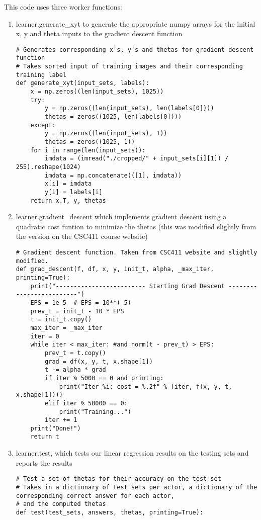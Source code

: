 \documentclass[11pt,a4paper]{report}
\begin{document}
This code uses three worker functions: 
\begin{enumerate}
\item learner.generate\_xyt to generate the appropriate numpy arrays for the initial x, y and theta inputs to the gradient descent function
\begin{lstlisting}
# Generates corresponding x's, y's and thetas for gradient descent function
# Takes sorted input of training images and their corresponding training label
def generate_xyt(input_sets, labels):
    x = np.zeros((len(input_sets), 1025))
    try:
        y = np.zeros((len(input_sets), len(labels[0])))
        thetas = zeros((1025, len(labels[0])))
    except:
        y = np.zeros((len(input_sets), 1))
        thetas = zeros((1025, 1))
    for i in range(len(input_sets)):
        imdata = (imread("./cropped/" + input_sets[i][1]) / 255).reshape(1024)
        imdata = np.concatenate(([1], imdata))
        x[i] = imdata
        y[i] = labels[i]
    return x.T, y, thetas
\end{lstlisting}
\item learner.gradient\_descent which implements gradient descent using a quadratic cost funtion to minimize the thetas (this was modified slightly from the version on the CSC411 course website)
\begin{lstlisting}
# Gradient descent function. Taken from CSC411 website and slightly modified.
def grad_descent(f, df, x, y, init_t, alpha, _max_iter, printing=True):
    print("------------------------- Starting Grad Descent -------------------------")
    EPS = 1e-5  # EPS = 10**(-5)
    prev_t = init_t - 10 * EPS
    t = init_t.copy()
    max_iter = _max_iter
    iter = 0
    while iter < max_iter: #and norm(t - prev_t) > EPS:
        prev_t = t.copy()
        grad = df(x, y, t, x.shape[1])
        t -= alpha * grad
        if iter % 5000 == 0 and printing:
            print("Iter %i: cost = %.2f" % (iter, f(x, y, t, x.shape[1])))
        elif iter % 50000 == 0:
            print("Training...")
        iter += 1
    print("Done!")
    return t
\end{lstlisting}
\item learner.test, which tests our linear regression results on the testing sets and reports the results
\begin{lstlisting}
# Test a set of thetas for their accuracy on the test set
# Takes in a dictionary of test sets per actor, a dictionary of the corresponding correct answer for each actor,
# and the computed thetas
def test(test_sets, answers, thetas, printing=True):

\end{lstlisting}
\end{enumerate}
\end{document}
